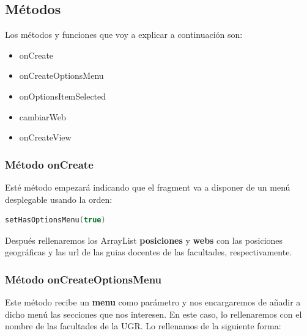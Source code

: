 \documentclass[a4paper,11pt]{article}
\begin{document}
\newpage

\subsection{Métodos}

\vspace{5 mm}

Los métodos y funciones que voy a explicar a continuación son:

\begin{itemize}
\item{onCreate}
\item{onCreateOptionsMenu}
\item{onOptionsItemSelected}
\item{cambiarWeb}
\item{onCreateView}
\end{itemize}

\vspace{5 mm}

\subsubsection{Método onCreate}

\vspace{5 mm}

Esté método empezará indicando que el fragment va a disponer de un menú desplegable usando la orden:

\vspace{5 mm}

\begin{lstlisting}[language=Kotlin]
setHasOptionsMenu(true)
\end{lstlisting}

\vspace{5 mm}

Después rellenaremos los ArrayList \textbf{posiciones} y \textbf{webs} con las posiciones geográficas y las url de las guias docentes de las facultades, respectivamente.

\vspace{5 mm}

\subsubsection{Método onCreateOptionsMenu}

\vspace{5 mm}

Este método recibe un \textbf{menu} como parámetro y nos encargaremos de añadir a dicho menú las secciones que nos interesen. En este caso, lo rellenaremos con el nombre de las facultades de la UGR. Lo rellenamos de la siguiente forma:
\end{document}
